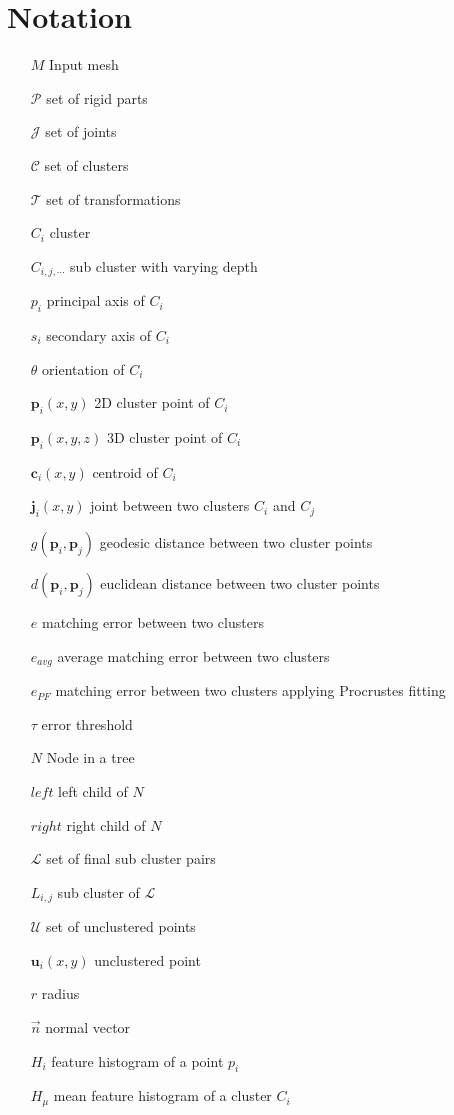 \chapter{Notation}
\label{cha:Notation}

\begin{itemize}
	\item[$M$] Input mesh
	\item[$\mathcal{P}$] set of rigid parts
	\item[$\mathcal{J}$] set of joints
	\item[$\mathcal{C}$] set of clusters
	\item[$\mathcal{T}$] set of transformations
	\item[$C_i$] cluster
	\item[$C_{i,j,\cdots}$] sub cluster with varying depth
	\item[$p_i$] principal axis of $C_i$
	\item[$s_i$] secondary axis of $C_i$
	\item[$\theta$] orientation of $C_i$
	\item[$\boldsymbol{p}_i(x,y)$] 2D cluster point of $C_i$
	\item[$\boldsymbol{p}_i(x,y,z)$] 3D cluster point of $C_i$
	\item[$\boldsymbol{c}_i(x,y)$] centroid of $C_i$
	\item[$\boldsymbol{j}_i(x,y)$] joint between two clusters $C_i$ and $C_j$
	\item[$g(\boldsymbol{p}_i,\boldsymbol{p}_j)$] geodesic distance between two cluster points
	\item[$d(\boldsymbol{p}_i,\boldsymbol{p}_j)$] euclidean distance between two cluster points
	\item[$e$] matching error between two clusters
	\item[$e_{avg}$] average matching error between two clusters 
	\item[$e_{PF}$] matching error between two clusters applying Procrustes fitting
	\item[$\tau$] error threshold 
	\item[$N$] Node in a tree
	\item[$\mathit{left}$] left child of $N$
	\item[$\mathit{right}$] right child of $N$
	\item[$\mathcal{L}$] set of final sub cluster pairs
	\item[$L_{i,j}$] sub cluster of $\mathcal{L}$	
	\item[$\mathcal{U}$] set of unclustered points
	\item[$\boldsymbol{u}_i(x,y)$] unclustered point
	\item[$r$] radius
	\item[$\vec{n}$] normal vector
	\item[$H_i$] feature histogram of a point $p_i$
	\item[$H_\mu$] mean feature histogram of a cluster $C_i$
\end{itemize}


